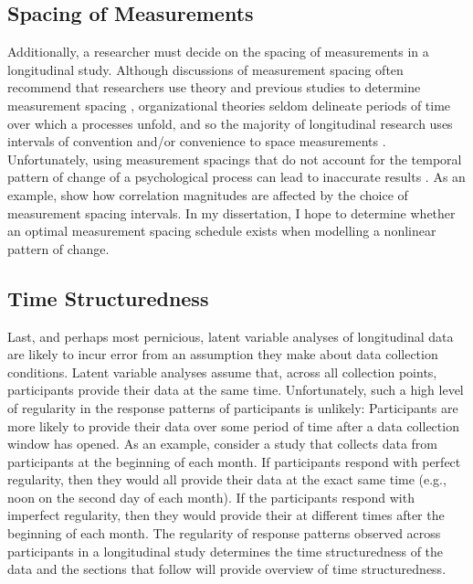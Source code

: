 \documentclass[
12pt, %
twoside,
english]{guelphthesis}
\begin{document}
\hypertarget{spacing-of-measurements}{%
\subsection{Spacing of Measurements}\label{spacing-of-measurements}}

Additionally, a researcher must decide on the spacing of measurements in a longitudinal study. Although discussions of measurement spacing often recommend that researchers use theory and previous studies to determine measurement spacing \autocite{mitchell2001,cole2003,collins2006,dormann2014,dormann2015}, organizational theories seldom delineate periods of time over which a processes unfold, and so the majority of longitudinal research uses intervals of convention and/or convenience to space measurements \autocite{mitchell2001,dormann2014}. Unfortunately, using measurement spacings that do not account for the temporal pattern of change of a psychological process can lead to inaccurate results \autocite[e.g.,][]{chen2014}. As an example, \textcite{cole2009} show how correlation magnitudes are affected by the choice of measurement spacing intervals. In my dissertation, I hope to determine whether an optimal measurement spacing schedule exists when modelling a nonlinear pattern of change.

\hypertarget{time-structuredness}{%
\subsection{Time Structuredness}\label{time-structuredness}}

Last, and perhaps most pernicious, latent variable analyses of longitudinal data are likely to incur error from an assumption they make about data collection conditions. Latent variable analyses assume that, across all collection points, participants provide their data at the same time. Unfortunately, such a high level of regularity in the response patterns of participants is unlikely: Participants are more likely to provide their data over some period of time after a data collection window has opened. As an example, consider a study that collects data from participants at the beginning of each month. If participants respond with perfect regularity, then they would all provide their data at the exact same time (e.g., noon on the second day of each month). If the participants respond with imperfect regularity, then they would provide their at different times after the beginning of each month. The regularity of response patterns observed across participants in a longitudinal study determines the time structuredness of the data and the sections that follow will provide overview of time structuredness.
\end{document}
